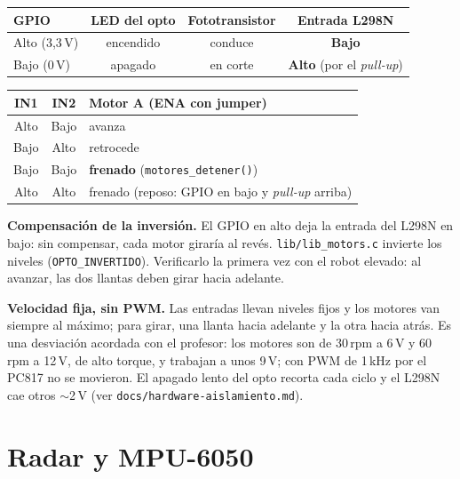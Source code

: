 \documentclass[11pt,a4paper]{article}
\newenvironment{nota}
  {\par\medskip\begin{lrbox}{\notabox}%
   \begin{minipage}{\dimexpr0.95\linewidth-14pt\relax}\small}
  {\end{minipage}\end{lrbox}%
   \begin{center}\setlength{\fboxsep}{7pt}\colorbox{cFondo}{\usebox{\notabox}}\end{center}\medskip}
\begin{document}
\begin{center}
\small
\begin{tabular}{lccc}
\toprule
\textbf{GPIO} & \textbf{LED del opto} & \textbf{Fototransistor} & \textbf{Entrada L298N}\\
\midrule
Alto (3{,}3\,V) & encendido & conduce & \textbf{Bajo}\\
Bajo (0\,V)     & apagado   & en corte & \textbf{Alto} (por el \emph{pull-up})\\
\bottomrule
\end{tabular}
\end{center}

\begin{center}
\small
\begin{tabular}{ccl}
\toprule
\textbf{IN1} & \textbf{IN2} & \textbf{Motor A (ENA con jumper)}\\
\midrule
Alto & Bajo & avanza\\
Bajo & Alto & retrocede\\
Bajo & Bajo & \textbf{frenado} (\texttt{motores\_detener()})\\
Alto & Alto & frenado (reposo: GPIO en bajo y \emph{pull-up} arriba)\\
\bottomrule
\end{tabular}
\end{center}

\begin{nota}
\textbf{Compensación de la inversión.} El GPIO en alto deja la entrada del
L298N en bajo: sin compensar, cada motor giraría al revés.
\texttt{lib/lib\_motors.c} invierte los niveles (\texttt{OPTO\_INVERTIDO}).
Verificarlo la primera vez con el robot elevado: al avanzar, las dos llantas
deben girar hacia adelante.\par\medskip
\textbf{Velocidad fija, sin PWM.} Las entradas llevan niveles fijos y los
motores van siempre al máximo; para girar, una llanta hacia adelante y la otra
hacia atrás. Es una desviación acordada con el profesor: los motores son de
30\,rpm a 6\,V y 60\,rpm a 12\,V, de alto torque, y trabajan a unos 9\,V; con PWM de 1\,kHz por el PC817
no se movieron. El apagado lento del opto recorta cada ciclo y el L298N cae
otros $\sim$2\,V (ver \texttt{docs/hardware-aislamiento.md}).
\end{nota}

\clearpage
\section{Radar y MPU-6050}
\end{document}
